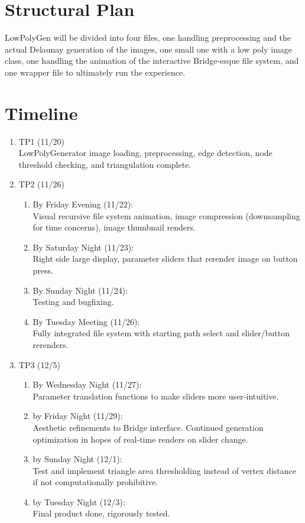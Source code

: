 \documentclass{article}
\begin{document}
\section{Structural Plan}
LowPolyGen will be divided into four files, one handling preprocessing and the actual Delaunay generation of the images, one small one with a low poly image class, one handling the animation of the interactive Bridge-esque file system, and one wrapper file to ultimately run the experience.

\section{Timeline}
\begin{enumerate}
    \item TP1 (11/20)\\
    LowPolyGenerator image loading, preprocessing, edge detection, node threshold checking, and triangulation complete.
    \item TP2 (11/26)
    \begin{enumerate}
        \item By Friday Evening (11/22):\\
        Visual recursive file system animation, image compression (downsampling for time concerns), image thumbnail renders.
        \item By Saturday Night (11/23):\\
        Right side large display, parameter sliders that rerender image on button press.
        \item By Sunday Night (11/24):\\
        Testing and bugfixing.
        \item By Tuesday Meeting (11/26):\\
        Fully integrated file system with starting path select and slider/button rerenders.
    \end{enumerate}
    \item TP3 (12/5)
    \begin{enumerate}
        \item By Wednesday Night (11/27):\\
        Parameter translation functions to make sliders more user-intuitive.
        \item by Friday Night (11/29):\\
        Aesthetic refinements to Bridge interface. Continued generation optimization in hopes of real-time renders on slider change.
        \item by Sunday Night (12/1):\\
        Test and implement triangle area thresholding instead of vertex distance if not computationally prohibitive.
        \item by Tuesday Night (12/3):\\
        Final product done, rigorously tested.

    \end{enumerate}

\end{enumerate}
\end{document}
